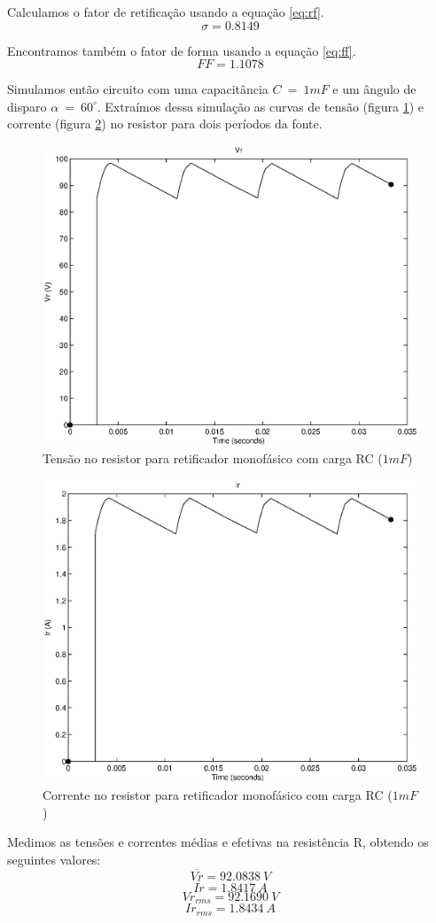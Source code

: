 \documentclass{report}
\begin{document}
Calculamos o fator de retificação usando a equação \ref{eq:rf}.
\begin{equation}
\sigma = 0.8149
\end{equation}

Encontramos também o fator de forma usando a equação \ref{eq:ff}.
\begin{equation}
FF = 1.1078
\end{equation}

Simulamos então circuito com uma capacitância $C\ =\ 1mF$ e um ângulo de disparo $\alpha\ =\ 60^\circ$. Extraímos dessa simulação as curvas de tensão (figura \ref{fig:rc2vr}) e corrente (figura \ref{fig:rc2ir}) no resistor para dois períodos da fonte.
\begin{figure}[H]
	\centering
	\includegraphics[width=0.7\linewidth]{matlab/rc2_vr}
	\caption{Tensão no resistor para retificador monofásico com carga RC ($1mF$)}
	\label{fig:rc2vr}
\end{figure}
\begin{figure}[H]
	\centering
	\includegraphics[width=0.7\linewidth]{matlab/rc2_ir}
	\caption{Corrente no resistor para retificador monofásico com carga RC ($1mF$)}
	\label{fig:rc2ir}
\end{figure}
Medimos as tensões e correntes médias e efetivas na resistência R, obtendo os seguintes valores:
\begin{equation}
\overline{Vr} = 92.0838\ V
\end{equation}
\begin{equation}
\overline{Ir} = 1.8417\ A
\end{equation}
\begin{equation}
Vr_{rms} = 92.1690\ V
\end{equation}
\begin{equation}
Ir_{rms} = 1.8434\ A
\end{equation}
\end{document}
